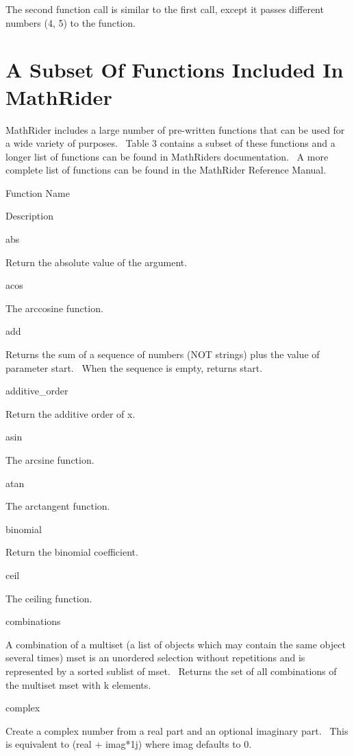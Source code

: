 \documentclass[12pt,twoside]{book}
\begin{document}
\bigskip

The second function call is similar to the first call, except it passes different numbers (4, 5) to the function.

\section[A Subset Of Functions Included In MathRider]{A Subset Of Functions Included In MathRider}

MathRider includes a large number of pre{}-written functions that can be used for a wide variety of purposes. \ Table 3 contains a subset of these functions and a longer list of functions can be found in MathRider{\textquotesingle}s documentation. \ A more complete list of functions can be found in the MathRider Reference Manual.

Function Name

Description

abs

Return the absolute value of the argument.

acos

The arccosine function.

add

Returns the sum of a sequence of numbers (NOT strings) plus the value of parameter {\textquotesingle}start{\textquotesingle}. \ When the sequence is empty, returns start.

additive\_order

Return the additive order of x.

asin 

The arcsine function.

atan

The arctangent function.

binomial

Return the binomial coefficient.

ceil

The ceiling function.

combinations

A combination of a multiset (a list of objects which may contain the same object several times) mset is an unordered selection without repetitions and is represented by a sorted sublist of mset. \ Returns the set of all combinations of the multiset mset with k elements.

complex

Create a complex number from a real part and an optional imaginary part. \ This is equivalent to (real + imag*1j) where imag defaults to 0.
\end{document}
